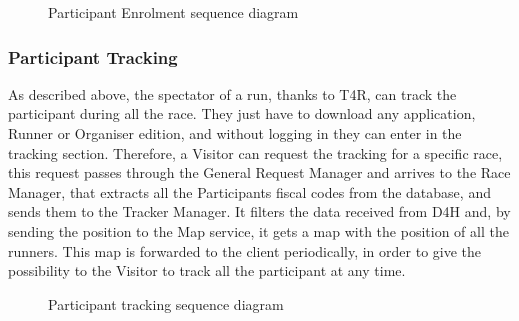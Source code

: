 \begin{figure}[H]
    \centering
    \caption{Participant Enrolment sequence diagram}
    \label{fig:log&regDiagram}
\end{figure}

\subsubsection{Participant Tracking}
As described above, the spectator of a run, thanks to T4R, can track the participant during all the race.
They just have to download any application, Runner or Organiser edition, and without logging in they can enter in the tracking section.
Therefore, a Visitor can request the tracking for a specific race, this request passes through the General Request Manager and arrives to the Race Manager, that extracts all the Participants fiscal codes from the database, and sends them to the Tracker Manager. It filters the data received from D4H and, by sending the position to the Map service, it gets a map with the position of all the runners. This map is forwarded to the client periodically, in order to give the possibility to the Visitor to track all the participant at any time.

\begin{figure}[H]
    \centering
    \caption{Participant tracking sequence diagram}
    \label{fig:log&regDiagram}
\end{figure}

